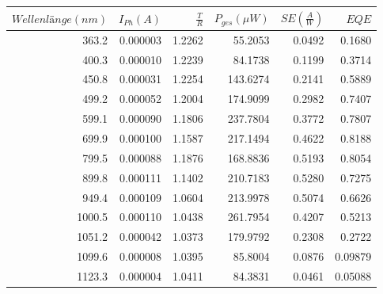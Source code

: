 \begin{center}
\begin{tabular}{rrrrrr}
    $Wellenlänge (nm)$ &  $I_{Ph} (A)$ &    $\frac{T}{R}$ &  $P_{ges} (\mu W)$ &  $SE (\frac{A}{W})$ &       $EQE$ \\
    \hline
    363.2 &  0.000003 &  1.2262 &   55.2053 &  0.0492 &   0.1680 \\
    400.3 &  0.000010 &  1.2239 &   84.1738 &  0.1199 &   0.3714 \\
    450.8 &  0.000031 &  1.2254 &  143.6274 &  0.2141 &   0.5889 \\
    499.2 &  0.000052 &  1.2004 &  174.9099 &  0.2982 &   0.7407 \\
    599.1 &  0.000090 &  1.1806 &  237.7804 &  0.3772 &   0.7807 \\
    699.9 &  0.000100 &  1.1587 &  217.1494 &  0.4622 &    0.8188 \\
    799.5 &  0.000088 &  1.1876 &  168.8836 &  0.5193 &   0.8054 \\
    899.8 &  0.000111 &  1.1402 &  210.7183 &  0.5280 &   0.7275 \\
    949.4 &  0.000109 &  1.0604 &  213.9978 &  0.5074 &   0.6626 \\
    1000.5 &  0.000110 &  1.0438 &  261.7954 &  0.4207 &   0.5213 \\
    1051.2 &  0.000042 &  1.0373 &  179.9792 &  0.2308 &   0.2722 \\
    1099.6 &  0.000008 &  1.0395 &   85.8004 &  0.0876 &  0.09879 \\
    1123.3 &  0.000004 &  1.0411 &   84.3831 &  0.0461 &  0.05088 \\

\end{tabular}
\label{tab:32multi}
\end{center}

